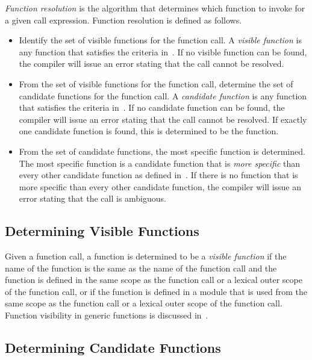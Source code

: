 \emph{Function resolution} is the algorithm that determines
which function to invoke for a given call expression.
Function resolution is defined as follows.
\begin{itemize}
\item
Identify the set of visible functions for the function call.  A
\emph{visible function} is any function that satisfies the criteria
in~.  If no visible function can
be found, the compiler will issue an error stating that the call
cannot be resolved.
\item
From the set of visible functions for the function call, determine the
set of candidate functions for the function call.  A \emph{candidate
function} is any function that satisfies the criteria
in~.  If no candidate function
can be found, the compiler will issue an error stating that the call
cannot be resolved.  If exactly one candidate function is found, this
is determined to be the function.
\item
From the set of candidate functions, the most specific function is
determined.  The most specific function is a candidate function that
is \emph{more specific} than every other candidate function as defined
in~.  If there is no
function that is more specific than every other candidate function,
the compiler will issue an error stating that the call is ambiguous.
\end{itemize}

\subsection{Determining Visible Functions}
\label{Determining_Visible_Functions}

Given a function call, a function is determined to be a \emph{visible
function} if the name of the function is the same as the name of the
function call and the function is defined in the same scope as the
function call or a lexical outer scope of the function call, or if the
function is defined in a module that is used from the same scope as
the function call or a lexical outer scope of the function call.
Function visibility in generic functions is discussed
in~.

\subsection{Determining Candidate Functions}
\label{Determining_Candidate_Functions}

